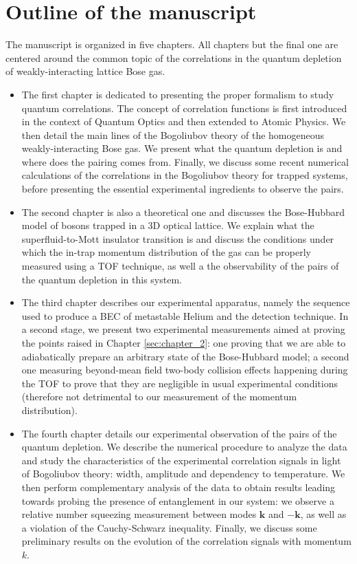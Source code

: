 \section*{Outline of the manuscript}

The manuscript is organized in five chapters. All chapters but the final one are centered around the common topic of the \kmk correlations in the quantum depletion of weakly-interacting lattice Bose gas.

\begin{itemize}
    \item The first chapter is dedicated to presenting the proper formalism to study quantum correlations. The concept of correlation functions is first introduced in the context of Quantum Optics and then extended to Atomic Physics. We then detail the main lines of the Bogoliubov theory of the homogeneous weakly-interacting Bose gas. We present what the quantum depletion is and where does the \kmk pairing comes from. Finally, we discuss some recent numerical calculations \cite{butera2020} of the correlations in the Bogoliubov theory for trapped systems, before presenting the essential experimental ingredients to observe the \kmk pairs.
    \item The second chapter is also a theoretical one and discusses the Bose-Hubbard model of bosons trapped in a 3D optical lattice. We explain what the superfluid-to-Mott insulator transition is and discuss the conditions under which the in-trap momentum distribution of the gas can be properly measured using a TOF technique, as well a the observability of the \kmk pairs of the quantum depletion in this system.
    \item The third chapter describes our experimental apparatus, namely the sequence used to produce a BEC of metastable Helium and the detection technique. In a second stage, we present two experimental measurements aimed at proving the points raised in Chapter \ref{sec:chapter_2}: one proving that we are able to adiabatically prepare an arbitrary state of the Bose-Hubbard model; a second one measuring beyond-mean field two-body collision effects happening during the TOF to prove that they are negligible in usual experimental conditions (therefore not detrimental to our measurement of the momentum distribution). 
    \item The fourth chapter details our experimental observation of the \kmk pairs of the quantum depletion. We describe the numerical procedure to analyze the data and study the characteristics of the experimental correlation signals in light of Bogoliubov theory: width, amplitude and dependency to temperature. We then perform complementary analysis of the data to obtain results leading towards probing the presence of entanglement in our system: we observe a relative number squeezing measurement between modes $\bm{k}$ and $-\bm{k}$, as well as a violation of the Cauchy-Schwarz inequality. Finally, we discuss some preliminary results on the evolution of the correlation signals with momentum $k$.

\end{itemize}
